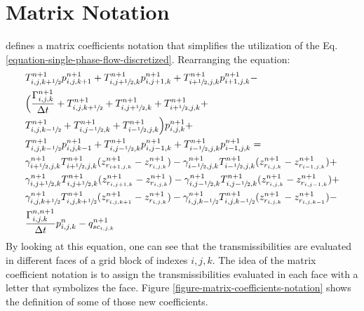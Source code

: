 \section{Matrix Notation}

\cite{Ertekin2001} defines a matrix coefficients notation that simplifies the utilization of the Eq.\ref{equation-single-phase-flow-discretized}.
%
Rearranging the equation:
%
\begin{align}\nonumber
	\label{equation-single-phase-flow-discretized-rearranged}
	& T^{n+1}_{i,j,k+\sfrac{1}{2}} p^{n+1}_{i,j,k+1} + T^{n+1}_{i,j+\sfrac{1}{2},k} p^{n+1}_{i,j+1,k} + T^{n+1}_{i+\sfrac{1}{2},j,k} p^{n+1}_{i+1,j,k} \nonumber -\\ &
	\Big( \frac{\Gamma_{i,j,k}^{n+1}}{\Delta t} + T^{n+1}_{i,j,k+\sfrac{1}{2}} + T^{n+1}_{i,j+\sfrac{1}{2},k} + T^{n+1}_{i+\sfrac{1}{2},j,k} \nonumber +\\ &
	T^{n+1}_{i,j,k-\sfrac{1}{2}} + T^{n+1}_{i,j-\sfrac{1}{2},k} + T^{n+1}_{i-\sfrac{1}{2},j,k} \Big) p^{n+1}_{i,j,k} \nonumber +\\ &
	T^{n+1}_{i,j,k-\sfrac{1}{2}} p^{n+1}_{i,j,k-1} + T^{n+1}_{i,j-\sfrac{1}{2},k} p^{n+1}_{i,j-1,k} + T^{n+1}_{i-\sfrac{1}{2},j,k} p^{n+1}_{i-1,j,k} 	\nonumber =\\ &
	\gamma^{n+1}_{i+\sfrac{1}{2},j,k} T^{n+1}_{i+\sfrac{1}{2},j,k}(z^{n+1}_{r_{i+1,j,k}}-z^{n+1}_{r_{i,j,k}}) - \gamma^{n+1}_{i-\sfrac{1}{2},j,k} T^{n+1}_{i-\sfrac{1}{2},j,k}(z^{n+1}_{r_{i,j,k}}-z^{n+1}_{r_{i-1,j,k}}) \nonumber +\\ &
	\gamma^{n+1}_{i,j+\sfrac{1}{2},k} T^{n+1}_{i,j+\sfrac{1}{2},k}(z^{n+1}_{r_{i,j+1,k}}-z^{n+1}_{r_{i,j,k}}) - \gamma^{n+1}_{i,j-\sfrac{1}{2},k} T^{n+1}_{i,j-\sfrac{1}{2},k}(z^{n+1}_{r_{i,j,k}}-z^{n+1}_{r_{i,j-1,k}}) \nonumber +\\ &
	\gamma^{n+1}_{i,j,k+\sfrac{1}{2}} T^{n+1}_{i,j,k+\sfrac{1}{2}}(z^{n+1}_{r_{i,j,k+1}}-z^{n+1}_{r_{i,j,k}}) - \gamma^{n+1}_{i,j,k-\sfrac{1}{2}} T^{n+1}_{i,j,k-\sfrac{1}{2}}(z^{n+1}_{r_{i,j,k}}-z^{n+1}_{r_{i,j,k-1}})\nonumber -\\ &
	\frac{\Gamma_{i,j,k}^{n,n+1}}{\Delta t} p_{i,j,k}^n - q^{n+1}_{sc_{i,j,k}}
\end{align}
%
By looking at this equation, one can see that the transmissibilities are evaluated in different faces of a grid block of indexes $i,j,k$.
%
The idea of the matrix coefficient notation is to assign the transmissibilities evaluated in each face with a letter that symbolizes the face.
%
Figure \ref{figure-matrix-coefficients-notation} shows the definition of some of those new coefficients.
